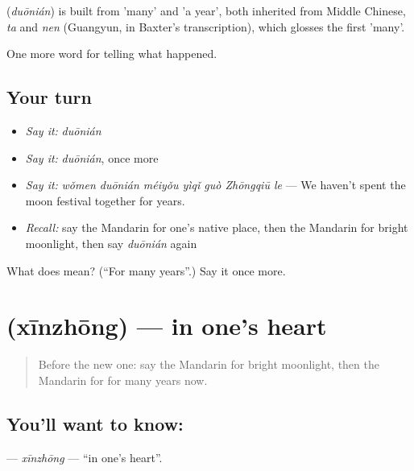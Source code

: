 \begin{cousinweb}
\textbf{} (\emph{duōnián}) is built from  'many' and  'a year', both inherited from Middle Chinese, \emph{ta} and \emph{nen} (Guangyun, in Baxter's transcription), which glosses the first 'many'.
\end{cousinweb}

\begin{grammarlens}[title={What you've built}]
One more word for telling what happened.
\end{grammarlens}

\subsection*{Your turn}
\begin{itemize}
\raggedright
  \item \emph{Say it:} \emph{duōnián}
  \item \emph{Say it:} \emph{duōnián}, once more
  \item \emph{Say it:} \emph{wǒmen duōnián méiyǒu yìqǐ guò Zhōngqiū le} — We haven't spent the moon festival together for years.
  \item \emph{Recall:} say the Mandarin for one's native place, then the Mandarin for bright moonlight, then say \emph{duōnián} again
\end{itemize}

\begin{tcolorbox}[breakable,colback=teal!4,colframe=teal!35!black,title={Before you move on}]
What does  mean? (\textquotedblleft{}For many years\textquotedblright{}.) Say it once more.
\end{tcolorbox}
\section[\texorpdfstring{\zh{心中} (xīnzhōng)}{心中 (xīnzhōng)}]{ (xīnzhōng) — in one's heart}

\label{lesson:ZH-C343-xinzhong}



\begin{quote}
Before the new one: say the Mandarin for bright moonlight, then the Mandarin for for many years now.
\end{quote}

\subsection*{You'll want to know: }
\textbf{} — \emph{xīnzhōng} — \textquotedblleft{}in one's heart\textquotedblright{}.

